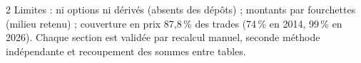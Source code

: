 \documentclass[11pt,a4paper]{article}
\begin{document}
\begin{multicols}{2}
\vspace{3pt}
{\footnotesize\color{gris}Limites : ni options ni dérivés (absents des dépôts) ; montants par fourchettes
(milieu retenu) ; couverture en prix 87,8\,\% des trades (74\,\% en 2014, 99\,\% en 2026). Chaque section
est validée par recalcul manuel, seconde méthode indépendante et recoupement des sommes entre tables.}

\end{multicols}
\end{document}
